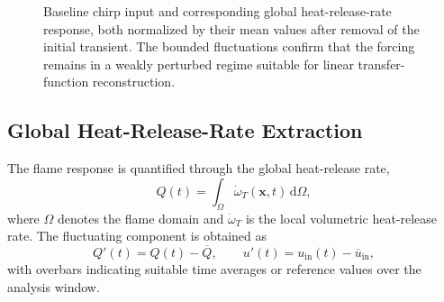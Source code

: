 \documentclass{iopconfser}
\begin{document}
\begin{figure}[!htbp]
  \centering
  \caption{Baseline chirp input and corresponding global heat-release-rate response, both normalized by their mean values after removal of the initial transient. The bounded fluctuations confirm that the forcing remains in a weakly perturbed regime suitable for linear transfer-function reconstruction.}
  \label{fig:chirp-signal}
\end{figure}
\FloatBarrier

\subsection{Global Heat-Release-Rate Extraction}
\label{subsec:heat-release}

The flame response is quantified through the global heat-release rate,
\begin{equation}
  Q(t) = \int_{\Omega} \dot{\omega}_T(\mathbf{x},t)\,\mathrm{d}\Omega,
  \label{eq:global-heat-release}
\end{equation}
where $\Omega$ denotes the flame domain and $\dot{\omega}_T$ is the local volumetric heat-release rate. The fluctuating component is obtained as
\begin{equation}
  Q'(t) = Q(t) - \overline{Q},
  \qquad
  u'(t) = u_{\mathrm{in}}(t) - \overline{u}_{\mathrm{in}},
  \label{eq:fluctuations}
\end{equation}
with overbars indicating suitable time averages or reference values over the analysis window.
\end{document}
